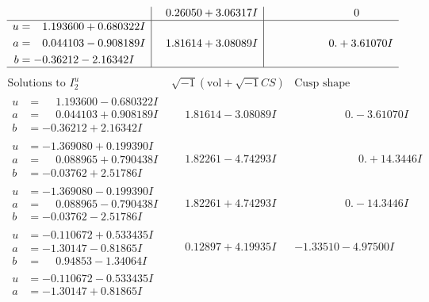 \documentclass[1p]{elsarticle_modified}
\theoremstyle{definition}
\newcommand{\I}{\sqrt{-1}}
\begin{document}
$$\begin{array}{c|c|c}
 & \phantom{-}0.26050 + 3.06317 I & \phantom{-0.000000 } 0 \\ \hline\begin{aligned}
u &= \phantom{-}1.193600 + 0.680322 I \\
a &= \phantom{-}0.044103 - 0.908189 I \\
b &= -0.36212 - 2.16342 I\end{aligned}
 & \phantom{-}1.81614 + 3.08089 I & \phantom{-0.000000 -}0. + 3.61070 I\\
 \hline 
 \end{array}$$\newpage$$\begin{array}{c|c|c}  
\text{Solutions to }I^u_{2}& \I (\text{vol} + \sqrt{-1}CS) & \text{Cusp shape}\\
 \hline 
\begin{aligned}
u &= \phantom{-}1.193600 - 0.680322 I \\
a &= \phantom{-}0.044103 + 0.908189 I \\
b &= -0.36212 + 2.16342 I\end{aligned}
 & \phantom{-}1.81614 - 3.08089 I & \phantom{-0.000000 } 0. - 3.61070 I \\ \hline\begin{aligned}
u &= -1.369080 + 0.199390 I \\
a &= \phantom{-}0.088965 + 0.790438 I \\
b &= -0.03762 + 2.51786 I\end{aligned}
 & \phantom{-}1.82261 - 4.74293 I & \phantom{-0.000000 -}0. + 14.3446 I \\ \hline\begin{aligned}
u &= -1.369080 - 0.199390 I \\
a &= \phantom{-}0.088965 - 0.790438 I \\
b &= -0.03762 - 2.51786 I\end{aligned}
 & \phantom{-}1.82261 + 4.74293 I & \phantom{-0.000000 } 0. - 14.3446 I \\ \hline\begin{aligned}
u &= -0.110672 + 0.533435 I \\
a &= -1.30147 - 0.81865 I \\
b &= \phantom{-}0.94853 - 1.34064 I\end{aligned}
 & \phantom{-}0.12897 + 4.19935 I & -1.33510 - 4.97500 I \\ \hline\begin{aligned}
u &= -0.110672 - 0.533435 I \\
a &= -1.30147 + 0.81865 I \\

\end{aligned}
\end{array}$$
\end{document}
